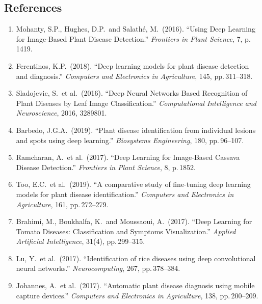 \documentclass[12pt,a4paper]{article}
\begin{document}
\subsection{References}

\begin{enumerate}[leftmargin=2em]
  \item Mohanty, S.P., Hughes, D.P.\ and Salath\'{e}, M.\ (2016). ``Using Deep Learning for Image-Based Plant Disease Detection.'' \textit{Frontiers in Plant Science}, 7, p.\,1419.

  \item Ferentinos, K.P.\ (2018). ``Deep learning models for plant disease detection and diagnosis.'' \textit{Computers and Electronics in Agriculture}, 145, pp.\,311--318.

  \item Sladojevic, S.\ et al.\ (2016). ``Deep Neural Networks Based Recognition of Plant Diseases by Leaf Image Classification.'' \textit{Computational Intelligence and Neuroscience}, 2016, 3289801.

  \item Barbedo, J.G.A.\ (2019). ``Plant disease identification from individual lesions and spots using deep learning.'' \textit{Biosystems Engineering}, 180, pp.\,96--107.

  \item Ramcharan, A.\ et al.\ (2017). ``Deep Learning for Image-Based Cassava Disease Detection.'' \textit{Frontiers in Plant Science}, 8, p.\,1852.

  \item Too, E.C.\ et al.\ (2019). ``A comparative study of fine-tuning deep learning models for plant disease identification.'' \textit{Computers and Electronics in Agriculture}, 161, pp.\,272--279.

  \item Brahimi, M., Boukhalfa, K.\ and Moussaoui, A.\ (2017). ``Deep Learning for Tomato Diseases: Classification and Symptoms Visualization.'' \textit{Applied Artificial Intelligence}, 31(4), pp.\,299--315.

  \item Lu, Y.\ et al.\ (2017). ``Identification of rice diseases using deep convolutional neural networks.'' \textit{Neurocomputing}, 267, pp.\,378--384.

  \item Johannes, A.\ et al.\ (2017). ``Automatic plant disease diagnosis using mobile capture devices.'' \textit{Computers and Electronics in Agriculture}, 138, pp.\,200--209.


\end{enumerate}
\end{document}
